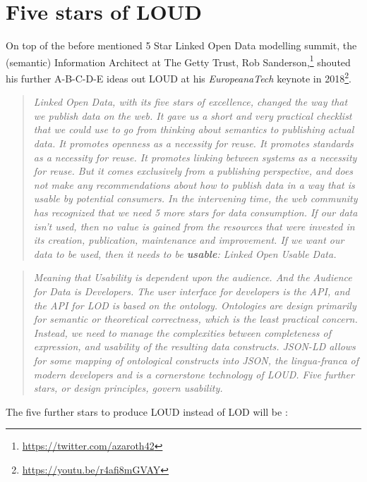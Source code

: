 \documentclass[twocolumn]{autart}
\begin{document}
\section{Five stars of LOUD}

On top of the before mentioned 5 Star Linked Open Data modelling summit, the (semantic) Information Architect at The Getty Trust, Rob Sanderson,\footnote{\url{https://twitter.com/azaroth42}} shouted his further A-B-C-D-E ideas out LOUD at his \textit{EuropeanaTech} keynote\cite{sanderson_shout_2018} in 2018\footnote{\url{https://youtu.be/r4afi8mGVAY}}.

\begin{quotation}
	\frqq\textit{Linked Open Data, with its five stars of excellence, changed the way that we publish data on the web. It gave us a short and very practical checklist that we could use to go from thinking about semantics to publishing actual data. It promotes openness as a necessity for reuse. It promotes standards as a necessity for reuse. It promotes linking between systems as a necessity for reuse. But it comes exclusively from a publishing perspective, and does not make any recommendations about how to publish data in a way that is usable by potential consumers. In the intervening time, the web community has recognized that we need 5 more stars for data consumption. If our data isn't used, then no value is gained from the resources that were invested in its creation, publication, maintenance and improvement. If we want our data to be used, then it needs to be \textbf{usable}: Linked Open Usable Data.}\flqq\cite{sanderson_loud_2018}
\end{quotation}

\begin{quotation}
	\frqq\textit{Meaning that Usability is dependent upon the audience. And the Audience for Data is Developers. The user interface for developers is the API, and the API for LOD is based on the ontology. Ontologies are design primarily for semantic or theoretical correctness, which is the least practical concern. Instead, we need to manage the complexities between completeness of expression, and usability of the resulting data constructs. JSON-LD allows for some mapping of ontological constructs into JSON, the lingua-franca of modern developers and is a cornerstone technology of LOUD. Five further stars, or design principles, govern usability.}\flqq\cite{sanderson_loud_2018}
\end{quotation}

The five further stars to produce LOUD instead of LOD will be \cite{sanderson_loud_2018}:
\end{document}
